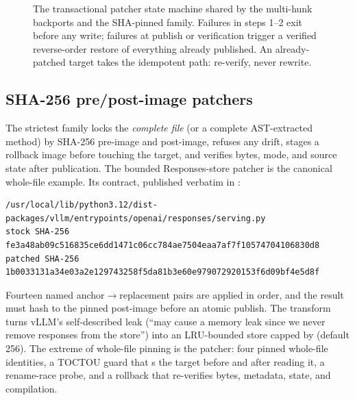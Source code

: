 \begin{figure}[htbp]
\caption{The transactional patcher state machine shared by the multi-hunk
backports and the SHA-pinned family. Failures in steps 1--2 exit before any
write; failures at publish or verification trigger a verified reverse-order
restore of everything already published. An already-patched target takes the
idempotent path: re-verify, never rewrite.}
\label{fig:patch-transaction}
\end{figure}

\subsection{SHA-256 pre/post-image patchers}

The strictest family locks the \emph{complete file} (or a complete
AST-extracted method) by SHA-256 pre-image and post-image, refuses any drift,
stages a rollback image before touching the target, and verifies bytes, mode,
and source state after publication. The bounded Responses-store patcher is the
canonical whole-file example. Its contract, published verbatim in
:

\begin{lstlisting}
/usr/local/lib/python3.12/dist-packages/vllm/entrypoints/openai/responses/serving.py
stock SHA-256   fe3a48ab09c516835ce6dd1471c06cc784ae7504eaa7af7f10574704106830d8
patched SHA-256 1b0033131a34e03a2e129743258f5da81b3e60e979072920153f6d09bf4e5d8f
\end{lstlisting}

Fourteen named anchor$\rightarrow$replacement pairs are applied in order, and
the result must hash to the pinned post-image before an atomic publish. The
transform turns vLLM's self-described leak (``may cause a memory leak since we
never remove responses from the store'') into an LRU-bounded store capped by
 (default 256). The extreme of
whole-file pinning is the  patcher: four pinned
whole-file identities, a TOCTOU guard that s the target before
and after reading it, a rename-race probe, and a rollback that re-verifies
bytes, metadata, state, and compilation.

